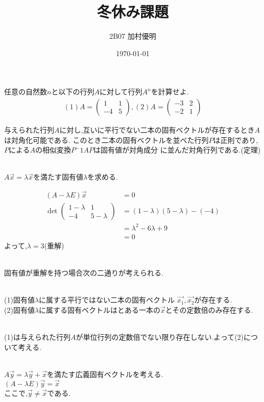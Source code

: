 \documentclass{jsarticle}
\title{冬休み課題}
\date{\today}
\author{2B07 加村優明}
\begin{document}
\maketitle

任意の自然数$n$と以下の行列$A$に対して行列$A^n$を計算せよ.
  \begin{align*}
  (1)A = \begin{pmatrix}
     1 & 1 \\
    -4 & 5
         \end{pmatrix},
  (2)A = \begin{pmatrix}
    -3 & 2 \\
    -2 & 1
         \end{pmatrix}         
  \end{align*}

与えられた行列$A$に対し,互いに平行でない二本の固有ベクトルが存在するとき$A$は対角化可能である.
このとき二本の固有ベクトルを並べた行列$P$は正則であり,$P$による$A$の相似変換$P^-1 AP$は固有値が対角成分
に並んだ対角行列である.(定理)

\leavevmode\\
$A \overrightarrow{x} = \lambda \overrightarrow{x}$を満たす固有値$\lambda$を求める. 

  \begin{align*}
    (A-\lambda E)\overrightarrow{x} &= 0\\
    \det\begin{pmatrix}
    1-\lambda & 1 \\
    -4 & 5-\lambda 
    \end{pmatrix}
  &=(1-\lambda)(5-\lambda)-(-4)\\
  &=\lambda ^2 -6\lambda +9\\
  &=0
  \end{align*} 
よって,$\lambda = 3$(重解)

\leavevmode\\
固有値が重解を持つ場合次の二通りが考えられる.

\leavevmode\\
(1)固有値$\lambda$に属する平行ではない二本の固有ベクトル $\overrightarrow{x_1},\overrightarrow{x_2}$が存在する.
\leavevmode\\
(2)固有値$\lambda$に属する固有ベクトルはとある一本の$\overrightarrow{x}$とその定数倍のみ存在する.

\leavevmode\\
(1)は与えられた行列$A$が単位行列の定数倍でない限り存在しない.よって(2)について考える.

\leavevmode\\
$A \overrightarrow{y} = \lambda \overrightarrow{y} + \overrightarrow{x}$を満たす広義固有ベクトルを考える.\\
$(A -\lambda E)\overrightarrow{y} = \overrightarrow{x}$\\ここで,$\overrightarrow{y}\neq \overrightarrow{x}である.$   
 
\end{document}
